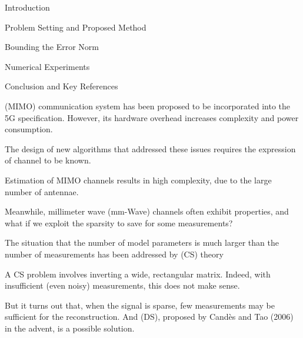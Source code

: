 

\Title {\TitleText}
\blank [big]

\Subtitle {\AuthorText}
\blank [big]

\Subsubtitle {\DateText}

\page [yes]
{
\I Introduction

\I Problem Setting and Proposed Method

\I Bounding the Error Norm

\I Numerical Experiments

\I Conclusion and Key References
}
{
\I {} (MIMO) communication system has been proposed to be incorporated into the 5G specification.
However, its hardware overhead increases complexity and power consumption.

\I The design of new algorithms that addressed these issues requires the expression of channel to be known.

\I Estimation of MIMO channels results in high complexity, due to the large number of antennae.

\I Meanwhile, millimeter wave (mm-Wave) channels often exhibit  properties, and what if we exploit the sparsity to save for some measurements?
}
{
\I The situation that the number of model parameters is much larger than the number of measurements has been addressed by  (CS) theory

\I A CS problem involves inverting a wide, rectangular matrix.
Indeed, with insufficient (even noisy) measurements, this does not make sense.

\I But it turns out that, when the signal is sparse, few measurements may be sufficient for the reconstruction.
And  (DS), proposed by Cand\`es and Tao (2006) in the advent, is a possible solution.
}

